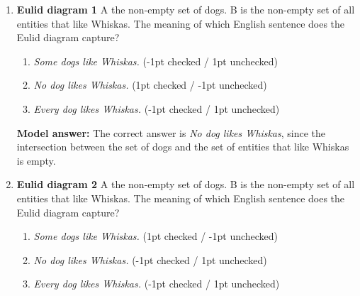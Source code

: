 \documentclass[a4,11pt]{article}
\begin{document}
\begin{enumerate}[leftmargin = 12pt]

\item {\bf Eulid diagram 1} A  the non-empty set of dogs. B is the non-empty set of all entities that like Whiskas. The meaning of which English sentence does the Eulid diagram capture?


      \begin{enumerate}[noitemsep]
        \item \textit{Some dogs like Whiskas.} (-1pt checked / 1pt unchecked)
	\item \textit{No dog likes Whiskas.} (1pt checked / -1pt unchecked)
        \item \textit{Every dog likes Whiskas.} (-1pt checked / 1pt unchecked)
	\end{enumerate}	

{\bf Model answer:}  The correct answer is \textit{No dog likes Whiskas}, since the intersection between the set of dogs and the set of entities that like Whiskas is empty.

\item {\bf Eulid diagram 2} A  the non-empty set of dogs. B is the non-empty set of all entities that like Whiskas. The meaning of which English sentence does the Eulid diagram capture?


      \begin{enumerate}[noitemsep]
        \item \textit{Some dogs like Whiskas.} (1pt checked / -1pt unchecked)
	\item \textit{No dog likes Whiskas.} (-1pt checked / 1pt unchecked)
        \item \textit{Every dog likes Whiskas.} (-1pt checked / 1pt unchecked)
	\end{enumerate}	


\end{enumerate}
\end{document}
